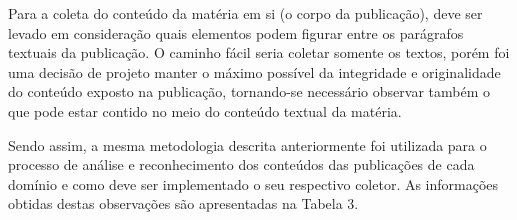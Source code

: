 Para a coleta do conteúdo da matéria em si (o corpo da publicação), deve ser levado em consideração quais elementos podem figurar entre os parágrafos textuais da publicação. O caminho fácil seria coletar somente os textos, porém foi uma decisão de projeto manter o máximo possível da integridade e originalidade do conteúdo exposto na publicação, tornando-se necessário observar também o que pode estar contido no meio do conteúdo textual da matéria. 

Sendo assim, a mesma metodologia descrita anteriormente foi utilizada para o processo de análise e reconhecimento dos conteúdos das publicações de cada domínio e como deve ser implementado o seu respectivo coletor. As informações obtidas destas observações são apresentadas na Tabela 3.  















